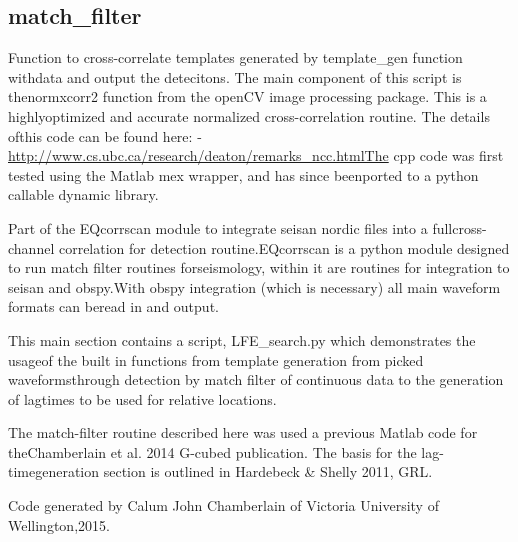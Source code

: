 \documentclass[a4paper,10pt,english]{sphinxmanual}
\begin{document}
\subsection{match\_filter}
\label{core:match-filter}\label{core:module-match_filter}
Function to cross-correlate templates generated by template\_gen function withdata and output the detecitons.  The main component of this script is thenormxcorr2 function from the openCV image processing package.  This is a highlyoptimized and accurate normalized cross-correlation routine.  The details ofthis code can be found here:    - \href{http://www.cs.ubc.ca/research/deaton/remarks\_ncc.htmlThe}{http://www.cs.ubc.ca/research/deaton/remarks\_ncc.htmlThe} cpp code was first tested using the Matlab mex wrapper, and has since beenported to a python callable dynamic library.

Part of the EQcorrscan module to integrate seisan nordic files into a fullcross-channel correlation for detection routine.EQcorrscan is a python module designed to run match filter routines forseismology, within it are routines for integration to seisan and obspy.With obspy integration (which is necessary) all main waveform formats can beread in and output.

This main section contains a script, LFE\_search.py which demonstrates the usageof the built in functions from template generation from picked waveformsthrough detection by match filter of continuous data to the generation of lagtimes to be used for relative locations.

The match-filter routine described here was used a previous Matlab code for theChamberlain et al. 2014 G-cubed publication.  The basis for the lag-timegeneration section is outlined in Hardebeck \& Shelly 2011, GRL.

Code generated by Calum John Chamberlain of Victoria University of Wellington,2015.
\end{document}
